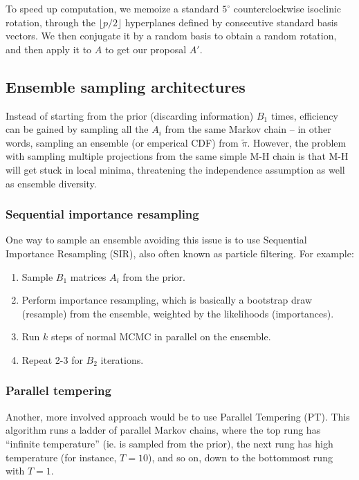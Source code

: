 \documentclass[ejs,preprint]{imsart}
\begin{document}
To speed up computation, we memoize a standard $5^\circ$ counterclockwise isoclinic rotation, through the $\lfloor p/2 \rfloor$ hyperplanes defined by consecutive standard basis vectors. We then conjugate it by a random basis to obtain a random rotation, and then apply it to $A$ to get our proposal $A'$.

\subsection{Ensemble sampling architectures}

Instead of starting from the prior (discarding information) $B_1$ times, efficiency can be gained by sampling all the $A_i$ from the same Markov chain -- in other words, sampling an ensemble (or emperical CDF) from $\tilde\pi$. However, the problem with sampling multiple projections from the same simple M-H chain is that M-H will get stuck in local minima, threatening the independence assumption as well as ensemble diversity.

\subsubsection{Sequential importance resampling}

One way to sample an ensemble avoiding this issue is to use Sequential Importance Resampling (SIR), also often known as particle filtering. For example:
\begin{enumerate}
	\item Sample $B_1$ matrices $A_i$ from the prior.
	\item Perform importance resampling, which is basically a bootstrap draw (resample) from the ensemble, weighted by the likelihoods (importances).
	\item Run $k$ steps of normal MCMC in parallel on the ensemble.
	\item Repeat 2-3 for $B_2$ iterations.
\end{enumerate}

\subsubsection{Parallel tempering}

Another, more involved approach would be to use Parallel Tempering (PT). This algorithm runs a ladder of parallel Markov chains, where the top rung has ``infinite temperature'' (ie. is sampled from the prior), the next rung has high temperature (for instance, $T=10$), and so on, down to the bottommost rung with $T=1$.
\end{document}
